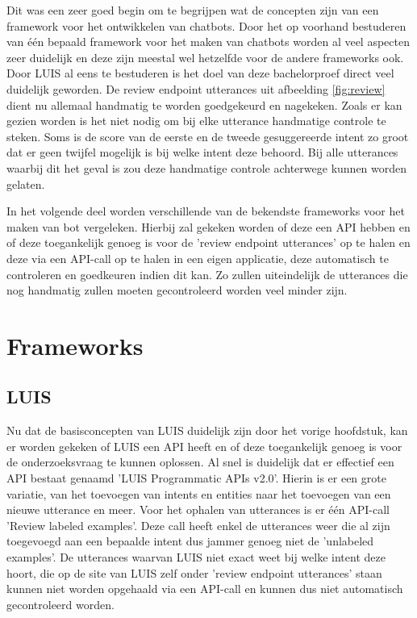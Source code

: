 Dit was een zeer goed begin om te begrijpen wat de concepten zijn van een framework voor het ontwikkelen van chatbots. Door het op voorhand bestuderen van één bepaald framework voor het maken van chatbots worden al veel aspecten zeer duidelijk en deze zijn meestal wel hetzelfde voor de andere frameworks ook. Door LUIS al eens te bestuderen is het doel van deze bachelorproef direct veel duidelijk geworden. De review endpoint utterances uit afbeelding \ref{fig:review} dient nu allemaal handmatig te worden goedgekeurd en nagekeken. Zoals er kan gezien worden is het niet nodig om bij elke utterance handmatige controle te steken. Soms is de score van de eerste en de tweede gesuggereerde intent zo groot dat er geen twijfel mogelijk is bij welke intent deze behoord. Bij alle utterances waarbij dit het geval is zou deze handmatige controle achterwege kunnen worden gelaten.

In het volgende deel worden verschillende van de bekendste frameworks voor het maken van bot vergeleken. Hierbij zal gekeken worden of deze een API hebben en of deze toegankelijk genoeg is voor de 'review endpoint utterances' op te halen en deze via een API-call op te halen in een eigen applicatie, deze automatisch te controleren en goedkeuren indien dit kan. Zo zullen uiteindelijk de utterances die nog handmatig zullen moeten gecontroleerd worden veel minder zijn.

\section{Frameworks}
\label{sec:Frameworks}

\subsection{LUIS}
\label{Luis}

Nu dat de basisconcepten van LUIS duidelijk zijn door het vorige hoofdstuk, kan er worden gekeken of LUIS een API heeft en of deze toegankelijk genoeg is voor de onderzoeksvraag te kunnen oplossen. Al snel is duidelijk dat er effectief een API bestaat genaamd 'LUIS Programmatic APIs v2.0'. Hierin is er een grote variatie, van het toevoegen van intents en entities naar het toevoegen van een nieuwe utterance en meer. Voor het ophalen van utterances is er één API-call 'Review labeled examples'. Deze call heeft enkel de utterances weer die al zijn toegevoegd aan een bepaalde intent dus jammer genoeg niet de 'unlabeled examples'. De utterances waarvan LUIS niet exact weet bij welke intent deze hoort, die op de site van LUIS zelf onder 'review endpoint utterances' staan kunnen niet worden opgehaald via een API-call en kunnen dus niet automatisch gecontroleerd worden.

